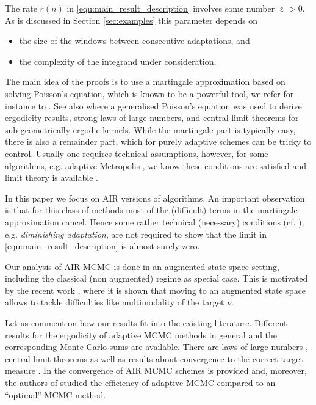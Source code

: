 \documentclass[12pt]{article}
\theoremstyle{definition}
\DeclareMathOperator{\eps}{\varepsilon}
\begin{document}
The rate $r(n)$ in \eqref{equ:main_result_description} involves some number $\eps>0$. 
As is discussed in Section \ref{sec:examples} this parameter depends on  
\begin{itemize}
	\item[1)] the size of the windows between consecutive adaptations, and
	\item[2)] the complexity of the integrand under consideration.
\end{itemize}

The main idea of the proofs is to use a martingale approximation based on solving Poisson's equation, which is known to be a powerful tool, we refer for instance to \cite{andrieu2006ergodicity,saksman2010ergodicity,atchade2013Bayesian}.
See also \cite{atchade2010limit,atchade2012limit} where a generalised Poisson's equation was used to derive ergodicity results, strong laws of large numbers, and central limit theorems for sub-geometrically ergodic kernels.
While the martingale part is typically easy, there is also a remainder part, which for purely adaptive schemes can be tricky to control.
Usually one requires technical assumptions, however, 
for some algorithms, e.g. adaptive Metropolis \cite{haario2001adaptive}, we know these conditions are satisfied and limit theory is available \cite{andrieu2006ergodicity,saksman2010ergodicity}. 


In this paper we focus on AIR versions of algorithms. 
An important observation is that for this class of methods most of the (difficult) terms in the martingale approximation cancel. 
Hence some rather technical (necessary) conditions (cf. \cite{atchade2005adaptive,laitinen2024invitationadaptivemarkovchain}), e.g. \textit{diminishing adaptation}, are not required to show that the limit in \eqref{equ:main_result_description} is almost surely zero.


Our analysis of AIR MCMC is done in an augmented state space setting, including the classical (non augmented) regime as special case.
This is motivated by the recent work \cite{Pompe_2020Framework}, where it is shown that moving to an augmented state space allows to tackle difficulties like multimodality of the target $\nu$.



Let us comment on how our results fit into the existing literature.
Different results for the ergodicity of adaptive MCMC methods in general and the corresponding Monte Carlo sums are available. 
There are laws of large numbers \cite{haario2001adaptive,atchade2005adaptive, andrieu2006ergodicity,roberts2007coupling,saksman2010ergodicity,fort2011convergence,Pompe_2020Framework}, central limit theorems \cite{andrieu2006ergodicity,saksman2010ergodicity} as well as results about convergence to the correct target measure \cite{roberts2007coupling,fort2011convergence}.
In \cite{chimisov2018air} the convergence of AIR MCMC schemes is provided and,
moreover,  the authors of \cite{andrieu2007efficiency} studied the efficiency of adaptive MCMC compared to an ``optimal'' MCMC method. 
\end{document}
